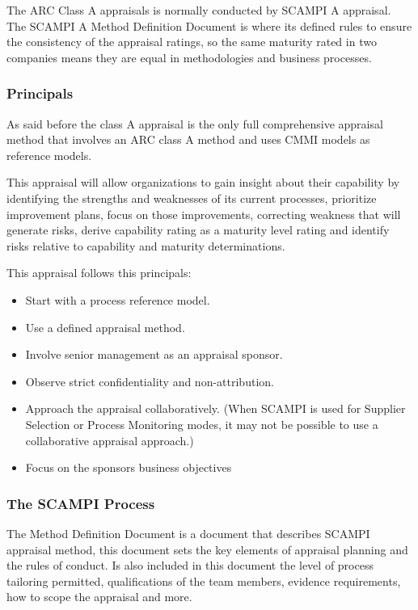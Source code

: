 The ARC Class A appraisals is normally conducted by SCAMPI A appraisal. The SCAMPI A Method Definition Document is where its defined rules to ensure the consistency of the appraisal ratings, so the same maturity rated in two companies means they are equal in methodologies and business processes.


\subsubsection{Principals}
As said before the class A appraisal is the only full comprehensive appraisal method that involves an ARC class A method and uses CMMI models as reference models.

This appraisal will allow organizations to gain insight about their capability by identifying the strengths and weaknesses of its current processes, prioritize improvement plans, focus on those improvements, correcting weakness that will generate risks, derive capability rating as a maturity level rating and identify risks relative to capability and maturity determinations.

This appraisal follows this principals:
\begin{itemize}
	\item Start with a process reference model.
	\item Use a defined appraisal method.
	\item Involve senior management as an appraisal sponsor.
	\item Observe strict confidentiality and non-attribution.
	\item Approach the appraisal collaboratively. (When SCAMPI is used for Supplier Selection or Process Monitoring modes, it may not be
	possible to use a collaborative appraisal approach.)
	\item Focus on the sponsors business objectives
\end{itemize}

\subsubsection{The SCAMPI Process}

The Method Definition Document is a document that describes SCAMPI appraisal method, this document sets the key elements of appraisal planning and the rules of conduct. Is also included in this document the level of process tailoring permitted, qualifications of the team members, evidence requirements, how to scope the appraisal and more.

